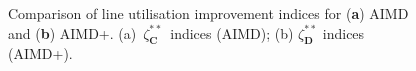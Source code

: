 \begin{figure}[htb]\centering
{}
\caption{Comparison of line utilisation improvement indices for (\textbf{a}) AIMD and (\textbf{b}) AIMD+. ({a})~$\zeta_\textbf{C}^{**}$~indices (AIMD); ({b}) $\zeta_\textbf{D}^{**}$ indices (AIMD+).}
\label{ch1:fig:utilisation-comparison-large}
\end{figure}
